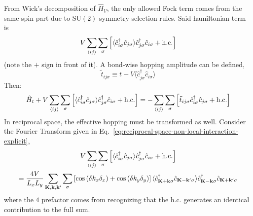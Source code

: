 From Wick's decomposition of $\hat H_V$, the only allowed Fock term comes from the same-spin part due to $\mathrm{SU}(2)$ symmetry selection rules. Said hamiltonian term is
\[
	V \sum_{\ev{ij}} \sum_\sigma \left[
		\langle
			\hat c_{i\sigma}^\dagger \hat c_{j\sigma}
		\rangle \hat c_{j\sigma}^\dagger  \hat c_{i\sigma} + \mathrm{h.c.}
	\right]
\]
(note the $+$ sign in front of it). A bond-wise hopping amplitude can be defined,
\[
	\tilde{t}_{ij\sigma} \equiv t - V \langle
		\hat c_{j\sigma}^\dagger \hat c_{i\sigma}
	\rangle
\]
Then:
\[
	\hat H_t + V \sum_{\ev{ij}} \sum_\sigma \left[
		\langle
			\hat c_{i\sigma}^\dagger \hat c_{j\sigma}
		\rangle \hat c_{j\sigma}^\dagger  \hat c_{i\sigma} + \mathrm{h.c.}
	\right] = - \sum_{\ev{ij}} \sum_\sigma 
	\left[
		\tilde{t}_{ij\sigma} \hat c_{i\sigma}^\dagger \hat c_{j\sigma} + \mathrm{h.c.}
	\right]
\]
In reciprocal space, the effective hopping must be transformed as well. Consider the Fourier Transform given in Eq.~\eqref{eq:reciprocal-space-non-local-interaction-explicit},
\begin{multline}
	V \sum_{\ev{ij}} \sum_\sigma \left[
		\langle
			\hat c_{i\sigma}^\dagger \hat c_{j\sigma}
		\rangle \hat c_{j\sigma}^\dagger  \hat c_{i\sigma} + \mathrm{h.c.}
	\right] \\
	= \frac{4V}{L_x L_y} \sum_{\mathbf{K}, \mathbf{k}, \mathbf{k}'} \sum_\sigma \left[
		\cos \left(
			\delta k_x \delta_x
			\right)	+ \cos \left(
			\delta k_y \delta_y
		\right)	
	\right]	
	\langle
		\hat c_{\mathbf{K}+\mathbf{k} \sigma}^\dagger 
		\hat c_{\mathbf{K}-\mathbf{k}' \sigma}
	\rangle
	\hat c_{\mathbf{K}-\mathbf{k} \sigma}^\dagger  \hat c_{\mathbf{K}+\mathbf{k}'\sigma} \label{eq:reciprocal-space-non-local-interaction-fock-intermediate}
\end{multline}
where the $4$ prefactor comes from recognizing that the $\mathrm{h.c.}$ generates an identical contribution to the full sum.

